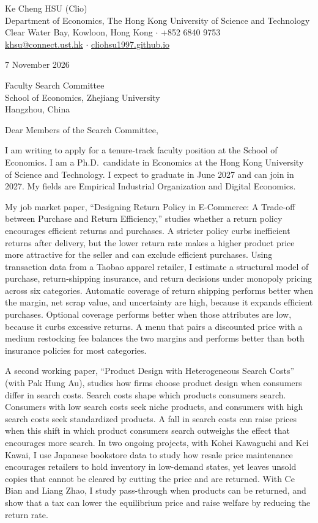 \documentclass[11pt]{article}
\begin{document}
\begin{flushleft}
Ke Cheng HSU (Clio) \\
Department of Economics, The Hong Kong University of Science and Technology \\
Clear Water Bay, Kowloon, Hong Kong $\cdot$ +852 6840 9753 \\
\href{mailto:khsu@connect.ust.hk}{khsu@connect.ust.hk} $\cdot$ \href{https://cliohsu1997.github.io/}{cliohsu1997.github.io}
\end{flushleft}

7 November 2026

\vspace{0.15em}
Faculty Search Committee \\
School of Economics, Zhejiang University \\
Hangzhou, China

\vspace{0.15em}
Dear Members of the Search Committee,

I am writing to apply for a tenure-track faculty position at the School of Economics. I am a Ph.D.\ candidate in Economics at the Hong Kong University of Science and Technology. I expect to graduate in June 2027 and can join in 2027. My fields are Empirical Industrial Organization and Digital Economics.

My job market paper, ``Designing Return Policy in E-Commerce: A Trade-off between Purchase and Return Efficiency,'' studies whether a return policy encourages efficient returns and purchases. A stricter policy curbs inefficient returns after delivery, but the lower return rate makes a higher product price more attractive for the seller and can exclude efficient purchases. Using transaction data from a Taobao apparel retailer, I estimate a structural model of purchase, return-shipping insurance, and return decisions under monopoly pricing across six categories. Automatic coverage of return shipping performs better when the margin, net scrap value, and uncertainty are high, because it expands efficient purchases. Optional coverage performs better when those attributes are low, because it curbs excessive returns. A menu that pairs a discounted price with a medium restocking fee balances the two margins and performs better than both insurance policies for most categories.

A second working paper, ``Product Design with Heterogeneous Search Costs'' (with Pak Hung Au), studies how firms choose product design when consumers differ in search costs. Search costs shape which products consumers search. Consumers with low search costs seek niche products, and consumers with high search costs seek standardized products. A fall in search costs can raise prices when this shift in which product consumers search outweighs the effect that encourages more search. In two ongoing projects, with Kohei Kawaguchi and Kei Kawai, I use Japanese bookstore data to study how resale price maintenance encourages retailers to hold inventory in low-demand states, yet leaves unsold copies that cannot be cleared by cutting the price and are returned. With Ce Bian and Liang Zhao, I study pass-through when products can be returned, and show that a tax can lower the equilibrium price and raise welfare by reducing the return rate.
\end{document}
